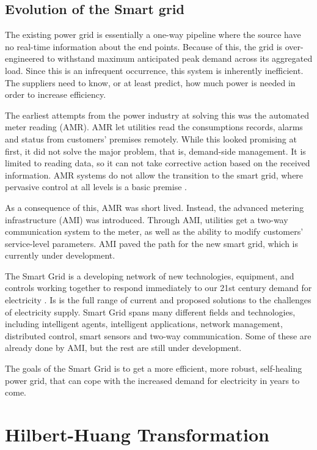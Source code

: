 \documentclass[12pt]{article}
\begin{document}
\subsection{Evolution of the Smart grid}
\label{smartGrid}
The existing power grid is essentially a one-way pipeline where the source have no real-time information about the end points. Because of this, the grid is over-engineered to withstand maximum anticipated peak demand across its aggregated load. Since this is an infrequent occurrence, this system is inherently inefficient. The suppliers need to know, or at least predict, how much power is needed in order to increase efficiency. 

The earliest attempts from the power industry at solving this was the automated meter reading (AMR). AMR let utilities read the consumptions records, alarms and status from customers' premises remotely. While this looked promising at first, it did not solve the major problem, that is, demand-side management. It is limited to reading data, so it can not take corrective action based on the received information. AMR systems do not allow the transition to the smart grid, where pervasive control at all levels is a basic premise \cite{smartgridPath}.

As a consequence of this, AMR was short lived. Instead, the advanced metering infrastructure (AMI) was introduced. Through AMI, utilities get a two-way communication system to the meter, as well as the ability to modify customers' service-level parameters. AMI paved the path for the new smart grid, which is currently under development.

The Smart Grid is a developing network of new technologies, equipment, and controls working together to respond immediately to our 21st century demand for electricity \cite{smartGridGov}. Is is the full range of current and proposed solutions to the challenges of electricity supply. Smart Grid spans many different fields and technologies, including intelligent agents, intelligent applications, network management, distributed control, smart sensors and two-way communication. Some of these are already done by AMI, but the rest are still under development. 

The goals of the Smart Grid is to get a more efficient, more robust, self-healing power grid, that can cope with the increased demand for electricity in years to come.



\section{Hilbert-Huang Transformation}
\label{hilbertHuangTransformation}
\end{document}

